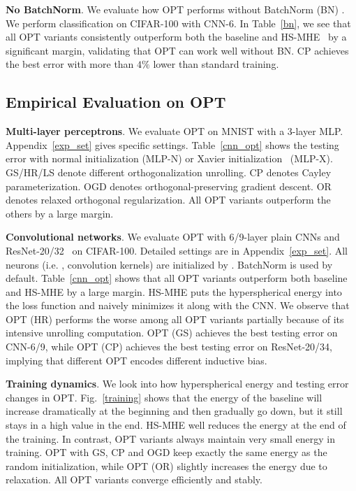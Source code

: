 \textbf{No BatchNorm}. We evaluate how OPT performs without BatchNorm (BN) \cite{ioffe2015batch}. We perform classification on CIFAR-100 with CNN-6. In Table~\ref{bn}, we see that all OPT variants consistently outperform both the baseline and HS-MHE~\cite{liu2018learning} by a significant margin, validating that OPT can work well without BN. CP achieves the best error with more than $4\%$ lower than standard training. 

\subsection{Empirical Evaluation on OPT}\label{CNN_exp}

\textbf{Multi-layer perceptrons}. We evaluate OPT on MNIST with a 3-layer MLP. Appendix~\ref{exp_set} gives specific settings. Table~\ref{cnn_opt} shows the testing error with normal initialization (MLP-N) or Xavier initialization~\cite{glorot2010understanding} (MLP-X). GS/HR/LS denote different orthogonalization unrolling. CP denotes Cayley parameterization. OGD denotes orthogonal-preserving gradient descent. OR denotes relaxed orthogonal regularization. All OPT variants outperform the others by a large margin.

\textbf{Convolutional networks}. We evaluate OPT with 6/9-layer plain CNNs and ResNet-20/32~\cite{he2016deep} on CIFAR-100. Detailed settings are in Appendix~\ref{exp_set}. All neurons (i.e. , convolution kernels) are initialized by \cite{he2015delving}. BatchNorm is used by default. Table~\ref{cnn_opt} shows that all OPT variants outperform both baseline and HS-MHE by a large margin. HS-MHE puts the  hyperspherical energy into the loss function and naively minimizes it along with the CNN. We observe that OPT (HR) performs the worse among all OPT variants partially because of its intensive unrolling computation. OPT (GS) achieves the best testing error on CNN-6/9, while OPT (CP) achieves the best testing error on ResNet-20/34, implying that different OPT encodes different inductive bias.

\textbf{Training dynamics}. We look into how hyperspherical energy and testing error changes in OPT. Fig.~\ref{training} shows that the energy of the baseline will increase dramatically at the beginning and then gradually go down, but it still stays in a high value in the end. HS-MHE well reduces the energy at the end of the training. In contrast, OPT variants always maintain very small energy in training. OPT with GS, CP and OGD keep exactly the same energy as the random initialization, while OPT (OR) slightly increases the energy due to relaxation. All OPT variants converge efficiently and stably.

